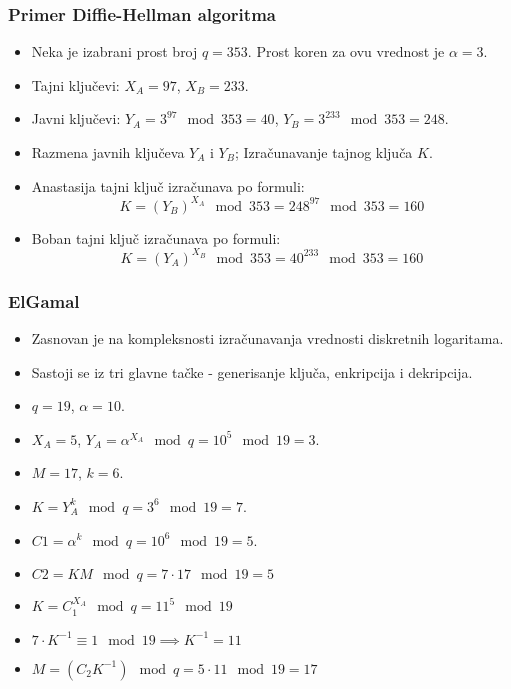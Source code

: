 \documentclass[14pt]{beamer}
\begin{document}
\begin{frame}[fragile]\frametitle{Primer Diffie-Hellman algoritma}
        \small
	\begin{itemize}	
		\item Neka je izabrani prost broj $q=353$. Prost koren za ovu vrednost je $\alpha=3$.
            \item Tajni ključevi: $X_A=97$, $X_B=233$.
            \item Javni ključevi: $Y_A=3^{97}\mod353=40$, \newline $Y_B=3^{233}\mod353=248$.
            \item Razmena javnih ključeva $Y_A$ i $Y_B$; Izračunavanje tajnog ključa $K$.
            \item Anastasija tajni ključ izračunava po formuli: $$K=(Y_B)^{X_A}\mod353=248^{97}\mod353=160$$
            \item Boban tajni ključ izračunava po formuli: $$K=(Y_A)^{X_B}\mod353=40^{233}\mod353=160$$
	\end{itemize}
\end{frame}

\begin{frame}[fragile]\frametitle{ElGamal}
        \footnotesize
	\begin{itemize}	
        \itemsep0em
		\item Zasnovan je na kompleksnosti izračunavanja vrednosti diskretnih logaritama.
            \item Sastoji se iz tri glavne tačke - generisanje ključa, enkripcija i dekripcija.
                    \item $q=19$, $\alpha=10$. 
                    \item $X_A=5$, $Y_A=\alpha^{X_A}\mod q=10^5\mod 19=3$.
                    \item $M=17$, $k=6$.
                    \item $K=Y_A^k\mod q=3^6\mod 19=7$.
                    \item $C1=\alpha^k \mod q=10^6\mod 19=5$.
                     \item $C2=KM\mod q=7\cdot17\mod 19=5$
                     \item $K=C_1^{X_A}\mod q=11^5\mod 19$
                    \item $7\cdot K^{-1} \equiv 1 \mod 19 \implies K^{-1}=11$
                    \item $M=(C_2K^{-1})\mod q=5\cdot 11 \mod 19=17$                
	\end{itemize}
\end{frame}
\end{document}
